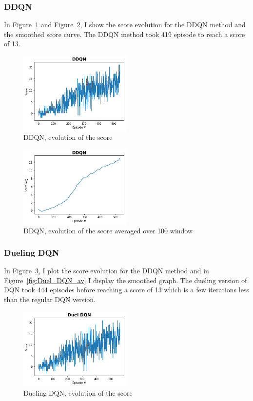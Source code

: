 \documentclass[12pt]{article}
\begin{document}
\subsubsection{DDQN}
In Figure~\ref{fig:DDQN} and Figure~\ref{fig:DDQN_av}, I show the score evolution for the DDQN method and the smoothed score curve. The DDQN method took 419 episode to reach a score of 13.
\begin{figure}[H]
 \centering
  \includegraphics[width=0.5\textwidth]{../PNG/ddqn.png}
  \caption{DDQN, evolution of the score}
  \label{fig:DDQN}
\end{figure}

\begin{figure}[H]
 \centering
  \includegraphics[width=0.5\textwidth]{../PNG/ddqn_smooth.png}
  \caption{DDQN, evolution of the score averaged over 100 window}
  \label{fig:DDQN_av}
\end{figure}


\subsubsection{Dueling DQN}

In Figure~\ref{fig:Duel_DQN}, I plot the score evolution for the DDQN method and in Figure~\ref{fig:Duel_DQN_av} I display the smoothed graph. The dueling version of DQN took 444 episodes before reaching a score of 13 which is a few iterations less than the regular DQN version.

\begin{figure}[H]
 \centering
  \includegraphics[width=0.5\textwidth]{../PNG/duel_dqn.png}
  \caption{Dueling DQN, evolution of the score}
  \label{fig:Duel_DQN}
\end{figure}
\end{document}
